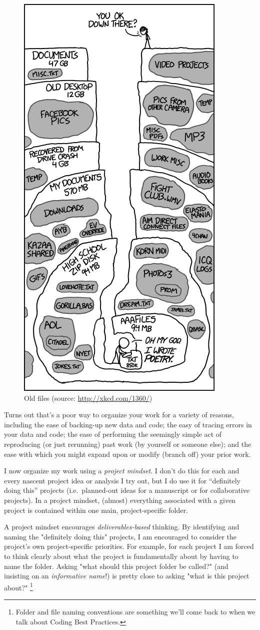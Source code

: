 \documentclass[12pt,letterpaper]{article}
\begin{document}
\begin{figure}[!h]
	\centering
	\includegraphics[width=0.5\linewidth]{figs/xkcd_old_files}
	\caption{Old files (source: \url{http://xkcd.com/1360/})}
	\label{fig:old_figs}
\end{figure}

Turns out that's a poor way to organize your work for a variety of reasons, including 
the ease of backing-up new data and code;
the easy of tracing errors in your data and code;
the ease of performing the seemingly simple act of reproducing (or just rerunning) past work
(by yourself or someone else);
and
the ease with which you might expand upon or modify (branch off) your prior work.

I now organize my work using a \emph{project mindset}.  
I don't do this for each and every nascent project idea or analysis I try out, 
but I do use it for ``definitely doing this'' projects 
(i.e.~planned-out ideas for a manuscript or for collaborative projects).
In a project mindset, 
(almost) everything associated with a given project is contained within one main, project-specific folder.

A project mindset encourages \emph{deliverables-based} thinking. 
By identifying and naming the "definitely doing this" projects, 
I am encouraged to consider the project's own project-specific priorities. 
For example, for each project I am forced to think clearly about what the project is fundamentally about by having to name the folder. 
Asking "what should this project folder be called?" 
(and insisting on an \emph{informative name}!)
is pretty close to asking "what is this project about?"
\unskip
\footnote{Folder and file naming conventions are something we'll come back to when we talk about Coding Best Practices.} 
		
\end{document}
